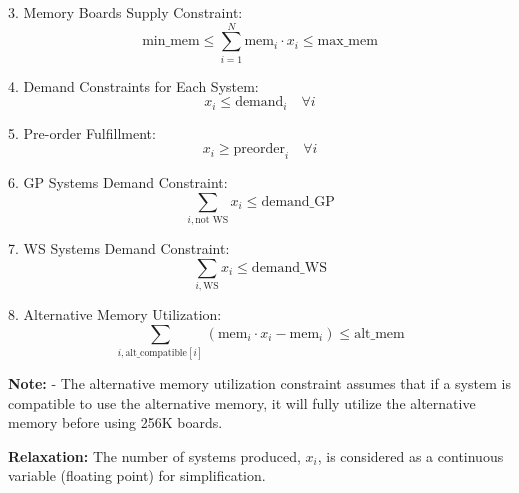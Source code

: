 \documentclass{article}
\begin{document}
3. Memory Boards Supply Constraint:
   \[
   \text{min\_mem} \leq \sum_{i=1}^{N} \text{mem}_i \cdot x_i \leq \text{max\_mem}
   \]

4. Demand Constraints for Each System:
   \[
   x_i \leq \text{demand}_i \quad \forall i
   \]

5. Pre-order Fulfillment:
   \[
   x_i \geq \text{preorder}_i \quad \forall i
   \]

6. GP Systems Demand Constraint:
   \[
   \sum_{i, \text{not WS}} x_i \leq \text{demand\_GP}
   \]

7. WS Systems Demand Constraint:
   \[
   \sum_{i, \text{WS}} x_i \leq \text{demand\_WS}
   \]

8. Alternative Memory Utilization:
   \[
   \sum_{i, \text{alt\_compatible}[i]} (\text{mem}_i \cdot x_i - \text{mem}_i) \leq \text{alt\_mem}
   \]

\textbf{Note:}
- The alternative memory utilization constraint assumes that if a system is compatible to use the alternative memory, it will fully utilize the alternative memory before using 256K boards.

\textbf{Relaxation:}
The number of systems produced, \( x_i \), is considered as a continuous variable (floating point) for simplification.
\end{document}
